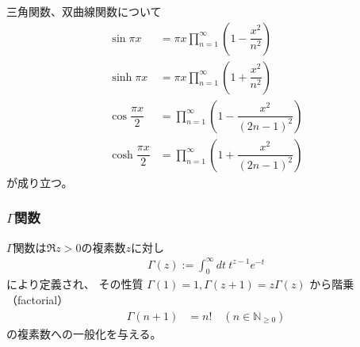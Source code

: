 三角関数、双曲線関数について
\begin{subequations}
\begin{align}
    \sin \pi x
    &=
    \pi x
    \prod_{n=1}^\infty
    \left(
        1 - \dfrac{x^2}{n^2}
    \right)
\label{infinite product of sine}
\\
    \sinh \pi x
    &=
    \pi x
    \prod_{n=1}^\infty
    \left(
        1 + \dfrac{x^2}{n^2}
    \right)
\label{infinite product of sine hyperbolic}
\\
    \cos \dfrac{\pi x}{2}
    &=
    \prod_{n=1}^\infty
    \left(
        1 - \dfrac{x^2}{(2n-1)^2}
    \right)
\\
    \cosh \dfrac{\pi x}{2}
    &=
    \prod_{n=1}^\infty
    \left(
        1 + \dfrac{x^2}{(2n-1)^2}
    \right)
\end{align}
\end{subequations}
が成り立つ。

\subsubsection{$\Gamma$関数}

$\Gamma$関数は$\Re z > 0$の複素数$z$に対し
\begin{align}
    \Gamma(z)
    := \int_0^\infty dt\ t^{z-1} e^{-t}
\end{align}
により定義され、
その性質
$\Gamma(1) = 1, \Gamma(z+1) = z\Gamma(z)$
から階乗（factorial）
\begin{align}
    \Gamma(n+1) &= n!
    \quad
    (n \in \mathbb{N}_{\ge0})
\end{align}
の複素数への一般化を与える。

